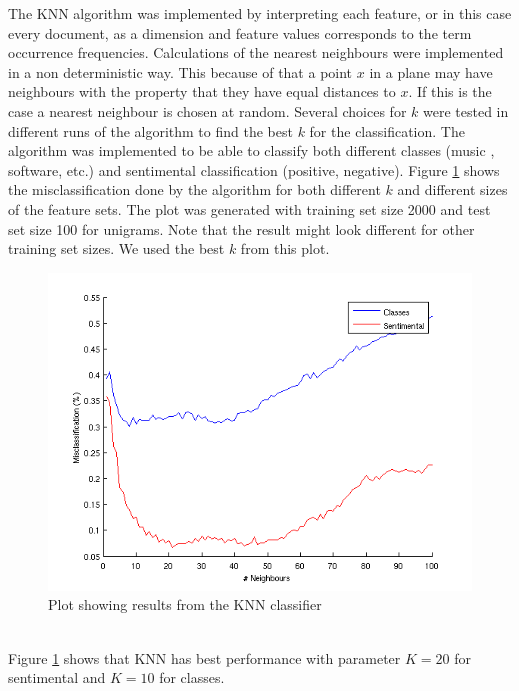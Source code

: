 The KNN algorithm was implemented by interpreting each feature, or in this case
every document, as a dimension and feature values corresponds to the term
occurrence frequencies. Calculations of the nearest neighbours were
implemented in a non deterministic way. This because of that a point $x$ in a plane
may have neighbours with the property that they have equal distances to
$x$. If this is the case a nearest neighbour is chosen at random. Several choices
for $k$ were tested in different runs of the algorithm to find the best $k$ for
the classification. The algorithm was implemented to be able to classify both
different classes (music , software, etc.) and sentimental classification
(positive, negative). Figure \ref{fig:KNNplot} shows the misclassification done by the
algorithm for both different $k$ and different sizes of the feature sets. The plot was generated with training set size 2000 and test set size 100 for unigrams. Note that the result might look different for other training set sizes. We used the best $k$ from this plot.
\begin{figure}[h!]
\centering
\includegraphics[scale=0.6]{../Plottar/knn_2000words_testdata100_unigram}
\caption{Plot showing results from the KNN classifier}
\label{fig:KNNplot}
\end{figure}\\
Figure \ref{fig:KNNplot} shows that KNN has best performance with parameter $K = 20$ for sentimental and $K = 10$ for classes.


